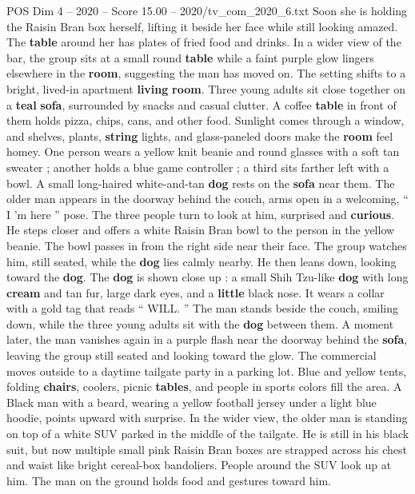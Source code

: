 \begin{textsample}{POS Dim 4 – 2020 – Score 15.00 – 2020/tv\_com\_2020\_6.txt}
Soon she is holding the Raisin Bran box herself, lifting it beside her face while still looking amazed.
The \textbf{table} around her has plates of fried food and drinks.
In a wider view of the bar, the group sits at a small round \textbf{table} while a faint purple glow lingers elsewhere in the \textbf{room}, suggesting the man has moved on.
The setting shifts to a bright, lived-in apartment \textbf{living} \textbf{room}.
Three young adults sit close together on a \textbf{teal} \textbf{sofa}, surrounded by snacks and casual clutter.
A coffee \textbf{table} in front of them holds pizza, chips, cans, and other food.
Sunlight comes through a window, and shelves, plants, \textbf{string} lights, and glass-paneled doors make the \textbf{room} feel homey.
One person wears a yellow knit beanie and round glasses with a soft tan sweater ; another holds a blue game controller ; a third sits farther left with a bowl.
A small long-haired white-and-tan \textbf{dog} rests on the \textbf{sofa} near them.
The older man appears in the doorway behind the couch, arms open in a welcoming, “ I ’m here ” pose.
The three people turn to look at him, surprised and \textbf{curious}.
He steps closer and offers a white Raisin Bran bowl to the person in the yellow beanie.
The bowl passes in from the right side near their face.
The group watches him, still seated, while the \textbf{dog} lies calmly nearby.
He then leans down, looking toward the \textbf{dog}.
The \textbf{dog} is shown close up : a small Shih Tzu-like \textbf{dog} with long \textbf{cream} and tan fur, large dark eyes, and a \textbf{little} black nose.
It wears a collar with a gold tag that reads “ WILL. ” The man stands beside the couch, smiling down, while the three young adults sit with the \textbf{dog} between them.
A moment later, the man vanishes again in a purple flash near the doorway behind the \textbf{sofa}, leaving the group still seated and looking toward the glow.
The commercial moves outside to a daytime tailgate party in a parking lot.
Blue and yellow tents, folding \textbf{chairs}, coolers, picnic \textbf{tables}, and people in sports colors fill the area.
A Black man with a beard, wearing a yellow football jersey under a light blue hoodie, points upward with surprise.
In the wider view, the older man is standing on top of a white SUV parked in the middle of the tailgate.
He is still in his black suit, but now multiple small pink Raisin Bran boxes are strapped across his chest and waist like bright cereal-box bandoliers.
People around the SUV look up at him.
The man on the ground holds food and gestures toward him.

\end{textsample}
